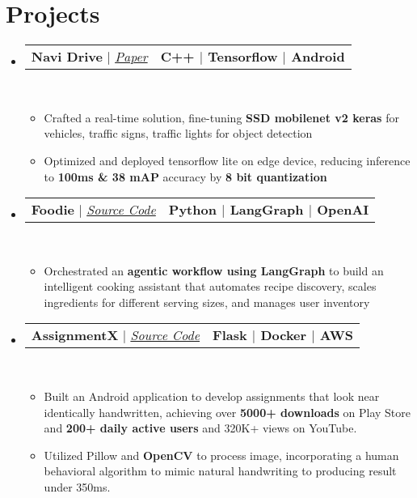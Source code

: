 \documentclass[letterpaper,8pt]{article}
\makeatletter
\newcommand{\resumeItem}[1]{
  \item\small{
    {#1 \vspace{0pt}}
  }
}
\newcommand{\resumeProjectHeading}[2]{
  \item
  \begin{tabular*}{1.001\textwidth}{l@{\extracolsep{\fill}}r}
    \small#1 & \textbf{\small #2}\\
  \end{tabular*}\vspace{-7pt}
}
\newcommand{\resumeSubHeadingListStart}{\begin{itemize}[leftmargin=0.0in, label={}]}
\newcommand{\resumeSubHeadingListEnd}{\end{itemize}}\vspace{0pt}
\newcommand{\resumeItemListStart}{\begin{itemize}[leftmargin=0.15in]}
\newcommand{\resumeItemListEnd}{\end{itemize}\vspace{-5pt}}
\makeatother
\begin{document}
\section{Projects}
    \resumeSubHeadingListStart
      \resumeProjectHeading{\textbf{{Navi Drive}} $|$ \emph{\href{http://ijrar.org/viewfull.php?\&p_id=IJRAR21B1839}{Paper}}}{C++ $|$ Tensorflow $|$ Android} \\[5mm]
        \resumeItemListStart
          \resumeItem{Crafted a real-time solution, fine-tuning \textbf{SSD mobilenet v2 keras} for vehicles, traffic signs, traffic lights for object  detection}
          \resumeItem{Optimized and deployed tensorflow lite on edge device, reducing inference to \textbf{100ms \& 38 mAP} accuracy by \textbf{8 bit quantization}}
        \resumeItemListEnd
      \vspace{-10pt}
      \resumeProjectHeading{\textbf{{Foodie}} $|$ \emph{\href{https://github.com/dedsec995/Foodiee/}{Source Code}}}{Python $|$ LangGraph $|$ OpenAI} \\[5mm]
        \resumeItemListStart
          \resumeItem{Orchestrated an \textbf{agentic workflow using LangGraph} to build an intelligent cooking assistant that automates recipe discovery, scales ingredients for different serving sizes, and manages user inventory}
        \resumeItemListEnd
      \resumeProjectHeading{\textbf{{AssignmentX}} $|$ \emph{\href{https://github.com/dedsec995/AssignmentX}{Source Code}}}{Flask $|$ Docker $|$ AWS } \\[5mm]
          \resumeItemListStart
            \resumeItem{Built an Android application to develop assignments that look near identically handwritten, achieving over \textbf{5000+ downloads} on Play Store and \textbf{200+ daily active users} and 320K+ views on YouTube.}
            \resumeItem{Utilized Pillow and \textbf{OpenCV} to process image, incorporating a human behavioral algorithm to mimic natural handwriting to producing result under 350ms.}
          \resumeItemListEnd
    \resumeSubHeadingListEnd
    \vspace{-20pt}
\vspace{10pt}

\vspace{-15pt}
\end{document}
